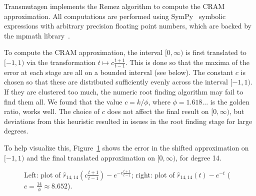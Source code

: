 Transmutagen implements the Remez algorithm to compute the CRAM approximation.
All computations are performed using SymPy~\cite{10.7717/peerj-cs.103}
symbolic expressions with arbitrary precision floating point numbers, which
are backed by the mpmath library~\cite{ationneeded}.

To compute the CRAM approximation, the interval $[0, \infty)$ is first
translated to $[-1, 1)$ via the transformation $t\mapsto c\frac{t+1}{t-1}$.
  This is done so that the maxima of the error at each
stage are all on a bounded interval (see below). The constant $c$ is chosen so
that these are distributed sufficiently evenly across the interval $[-1, 1)$.
If they are clustered too much, the numeric root finding algorithm may fail to
find them all. We found that the value $c=k/\phi$, where $\phi=1.618\ldots$ is
the golden ratio, works well. The choice of $c$ does not affect the final
result on $[0, \infty)$, but deviations from this heuristic resulted in issues
in the root finding stage for large degrees.

To help visualize this, Figure~\ref{fig:cram-plot} shows the error in the
shifted approximation on $[-1, 1)$ and the final translated approximation on
$[0, \infty)$, for degree 14.

\begin{figure}[!ht]
\centering
\resizebox{\textwidth}{!}{}
\caption{Left: plot of $\hat{r}_{14, 14}\left(c\frac{t+1}{t-1}\right) -
  e^{-c\frac{t+1}{t-1}}$; right: plot of $\hat{r}_{14, 14}(t) -
e^{-t}$ ($c=\frac{14}{\phi}\approx 8.652$).}
\label{fig:cram-plot}
\end{figure}

